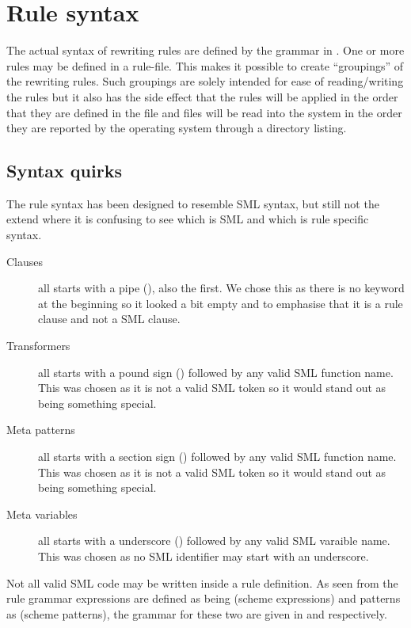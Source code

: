 \section{Rule syntax}

The actual syntax of rewriting rules are defined by the grammar in
. One or more rules may be defined in a rule-file. This
makes it possible to create ``groupings'' of the rewriting rules. Such groupings
are solely intended for ease of reading/writing the rules but it also has the
side effect that the rules will be applied in the order that they are defined in
the file and files will be read into the system in the order they are reported
by the operating system through a directory listing.

\subsection{Syntax quirks}

The rule syntax has been designed to resemble SML syntax, but still not the
extend where it is confusing to see which is SML and which is rule specific
syntax.

\begin{description}
\item[Clauses] all starts with a pipe (\ttt{|}), also the first. We chose this as
  there is no  keyword at the beginning so it looked a bit empty and to
  emphasise that it is a rule clause and not a SML clause.

\item[Transformers] all starts with a pound sign () followed by any valid
  SML function name. This was chosen as it is not a valid SML token so it would
  stand out as being something special.

\item[Meta patterns] all starts with a section sign () followed by any
  valid SML function name. This was chosen as it is not a valid SML token so it
  would stand out as being something special.

\item[Meta variables] all starts with a underscore (\ttt{\_}) followed by any
  valid SML varaible name. This was chosen as no SML identifier may start with
  an underscore.
\end{description}

Not all valid SML code may be written inside a rule definition. As seen from the
rule grammar expressions are defined as being  (scheme expressions)
and patterns as  (scheme patterns), the grammar for these two are
given in  and 
respectively.






